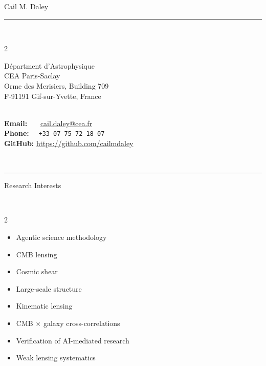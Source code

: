 \documentclass[11pt,a4paper]{article}
\begin{document}
\thispagestyle{empty}

\begin{cv}{Cail M. Daley}
  \noindent \rule{0.5\linewidth}{0.4pt}

  \setlength{\cvlabelwidth}{0mm}
  \setlength{\cvlabelsep}{0mm}
  \begin{cvlist}{}
  \item ~\vspace{-2\baselineskip}%
    \begin{multicols}{2}
    \item 
      Départment d’Astrophysique \\
      CEA Paris-Saclay \\
      Orme des Merisiers, Building 709 \\
      F-91191 Gif-sur-Yvette, France

      \columnbreak

    \item \ \\
      \textbf{Email:} \ \ \ \href{mailto:cail.daley@cea.fr}{cail.daley@cea.fr}\\
      \textbf{Phone:} \ \ \texttt{+33 07 75 72 18 07}\\ %
      \textbf{GitHub:} \href{https://github.com/cailmdaley} {https://github.com/cailmdaley}
    \end{multicols}
  \end{cvlist}

  ~\vspace{-2\baselineskip}%

  \noindent \rule{\linewidth}{0.4pt}

  \begin{cvlist}{Research Interests}
  \item ~\vspace{-2\baselineskip}%
    \begin{multicols}{2}

      \begin{itemize}[label={$\vcenter{\hbox{\scriptsize$\bullet$ \ }}$}]
        \item Agentic science methodology
        \item CMB lensing
        \item Cosmic shear
        \item Large-scale structure
      \end{itemize}

      \columnbreak

      \begin{itemize}[label={$\vcenter{\hbox{\scriptsize$\bullet$ \ }}$}]
        \item Kinematic lensing
        \item CMB $\times$ galaxy cross-correlations
        \item Verification of AI-mediated research
        \item Weak lensing systematics
      \end{itemize}
    \end{multicols}
  \end{cvlist}


\end{cv}
\end{document}
